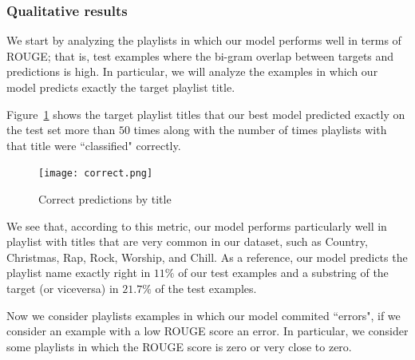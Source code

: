 \documentclass{article} %
\begin{document}
\subsubsection{Qualitative results}

We start by analyzing the playlists in which our model performs well in terms of ROUGE; that is, test examples where the bi-gram overlap between targets and predictions is high. 
In particular, we will analyze the examples in which our model predicts exactly the target playlist title. 

Figure~\ref{fig:correct} shows the target playlist titles that our best model predicted exactly on the test set more than $50$ times along with the number of times playlists with that title were ``classified" correctly. 

\begin{figure}[!hbt]
	\centering
		\texttt{[image: correct.png]}
	\caption{Correct predictions by title}
	\label{fig:correct}
\end{figure}
We see that, according to this metric, our model performs particularly well in playlist with titles that are very common in our dataset, such as Country, Christmas, Rap, Rock, Worship, and Chill.
As a reference, our model predicts the playlist name exactly right in $11\%$ of our test examples and a substring of the target (or viceversa) in $21.7\%$ of the test examples.

Now we consider playlists examples in which our model commited ``errors", if we consider an example with a low ROUGE score an error.
In particular, we consider some playlists in which the ROUGE score is zero or very close to zero.
\end{document}
